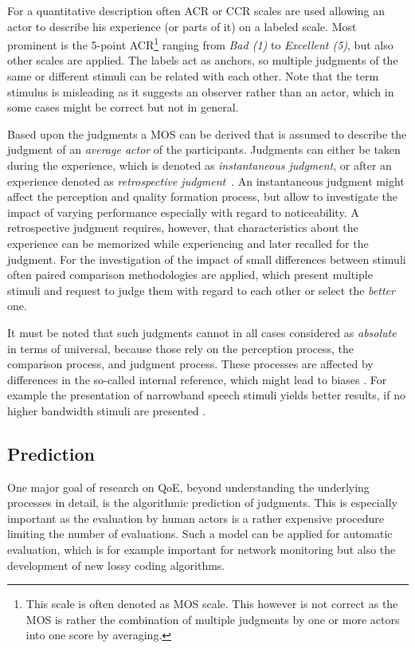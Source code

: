 For a quantitative description often \ac{ACR} or \ac{CCR} scales are used allowing an actor to describe his experience (or parts of it) on a labeled scale.
Most prominent is the 5-point \ac{ACR}\footnote{This scale is often denoted as  \ac{MOS} scale. This however is not correct as the \ac{MOS} is rather the combination of multiple judgments by one or more actors into one score by averaging.} ranging from \emph{Bad (1)} to \emph{Excellent (5)}, but also other scales are applied.
The labels act as anchors, so multiple judgments of the same or different stimuli can be related with each other.
Note that the term stimulus is misleading as it suggests an observer rather than an actor, which in some cases might be correct but not in general.

Based upon the judgments a \ac{MOS} can be derived that is assumed to describe the judgment of an \emph{average actor} of the participants.
Judgments can either be taken during the experience, which is denoted as \emph{instantaneous judgment}, or after an experience denoted as \emph{retrospective judgment}~\cite{weiss_temporal_2014}.
An instantaneous judgment might affect the perception and quality formation process, but allow to investigate the impact of varying performance especially with regard to noticeability.
A retrospective judgment requires, however, that characteristics about the experience can be memorized while experiencing and later recalled for the judgment.
For the investigation of the impact of small differences between stimuli often paired comparison methodologies are applied, which present multiple stimuli and request to judge them with regard to each other or select the \emph{better} one.

It must be noted that such judgments cannot in all cases considered as \emph{absolute} in terms of universal, because those rely on the perception process, the comparison process, and judgment process.
These processes are affected by differences in the so-called internal reference, which might lead to biases \citep[\cf,][]{zielinski_biases_2008, pitrey_aligning_2011}.
For example the presentation of narrowband speech stimuli yields better results, if no higher bandwidth stimuli are presented \citep[\cf,][]{koster_comparison_2015}.

\subsection{Prediction}
One major goal of research on \ac{QoE}, beyond understanding the underlying processes in detail, is the algorithmic prediction of judgments.
This is especially important as the evaluation by human actors is a rather expensive procedure limiting the number of evaluations.
Such a model can be applied for automatic evaluation, which is for example important for network monitoring but also the development of new lossy coding algorithms.

